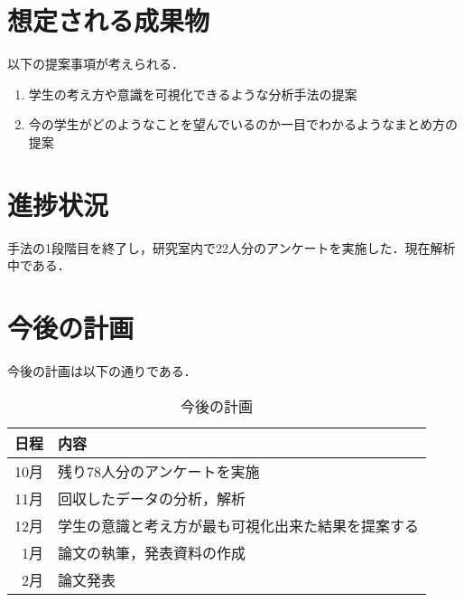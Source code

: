 \documentclass[uplatex,twocolumn,dvipdfmx]{jsarticle}
\begin{document}
\section{想定される成果物}
以下の提案事項が考えられる．
\begin{enumerate}
\item 学生の考え方や意識を可視化できるような分析手法の提案
\item 今の学生がどのようなことを望んでいるのか一目でわかるようなまとめ方の提案
\end{enumerate}

\section{進捗状況}
手法の1段階目を終了し，研究室内で22人分のアンケートを実施した．現在解析中である．
\section{今後の計画}

今後の計画は以下の通りである．
\begin{table}[hbtp]
  \caption{今後の計画}
  \label{table:data_type}
  \centering
  \begin{tabular}{rl}
    \hline
    日程 & 内容  \\ \hline \hline
    10月 & 残り78人分のアンケートを実施 \\
    11月 & 回収したデータの分析，解析 \\
    12月 & 学生の意識と考え方が最も可視化出来た結果を提案する \\
    1月 & 論文の執筆，発表資料の作成 \\
2月 & 論文発表\\
 \hline
  \end{tabular}
\end{table}



\end{document}
